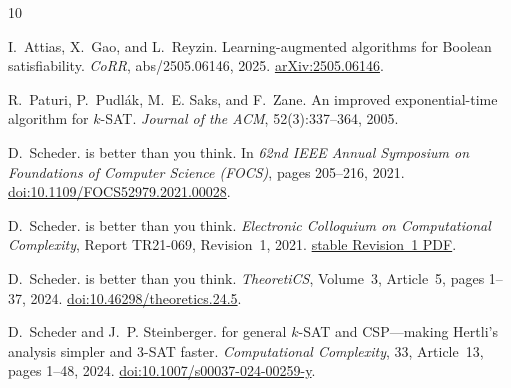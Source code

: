 \documentclass[11pt]{article}
\begin{document}
\begin{thebibliography}{10}
\small

I.~Attias, X.~Gao, and L.~Reyzin.
\newblock Learning-augmented algorithms for Boolean satisfiability.
\newblock \emph{CoRR}, abs/2505.06146, 2025.
\newblock \href{https://arxiv.org/abs/2505.06146}{arXiv:2505.06146}.

R.~Paturi, P.~Pudl\'ak, M.~E. Saks, and F.~Zane.
\newblock An improved exponential-time algorithm for $k$-{SAT}.
\newblock \emph{Journal of the ACM}, 52(3):337--364, 2005.

D.~Scheder.
 is better than you think.
\newblock In \emph{62nd IEEE Annual Symposium on Foundations of Computer Science (FOCS)}, pages 205--216, 2021.
\newblock \href{https://doi.org/10.1109/FOCS52979.2021.00028}{doi:10.1109/FOCS52979.2021.00028}.

D.~Scheder.
 is better than you think.
\newblock \emph{Electronic Colloquium on Computational Complexity}, Report TR21-069, Revision~1, 2021.
\newblock \href{https://eccc.weizmann.ac.il/report/2021/069/revision/1/download/}{stable Revision~1 PDF}.

D.~Scheder.
 is better than you think.
\newblock \emph{TheoretiCS}, Volume~3, Article~5, pages 1--37, 2024.
\newblock \href{https://doi.org/10.46298/theoretics.24.5}{doi:10.46298/theoretics.24.5}.

D.~Scheder and J.~P. Steinberger.
 for general $k$-{SAT} and {CSP}---making {Hertli}'s analysis simpler and 3-{SAT} faster.
\newblock \emph{Computational Complexity}, 33, Article~13, pages 1--48, 2024.
\newblock \href{https://doi.org/10.1007/s00037-024-00259-y}{doi:10.1007/s00037-024-00259-y}.

\end{thebibliography}
\end{document}
